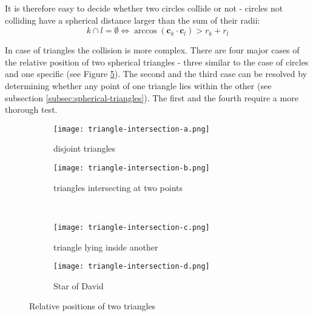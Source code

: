 It is therefore easy to decide whether two circles collide or not - circles not colliding have a spherical distance larger than the sum of their radii:
$$k \cap l = \emptyset \Longleftrightarrow \arccos(\mathbf{c}_k\cdot\mathbf{c}_l)>r_k+r_l$$

In case of triangles the collision is more complex. There are four major cases of the relative position of two spherical triangles - three  similar to the case of circles and one specific (see Figure \ref{fig:triangle-collisions}). The second and the third case can be resolved by determining whether any point of one triangle lies within the other (see subsection \ref{subsec:spherical-triangles}). The first and the fourth require a more thorough test.

\begin{figure}[ht]
\centering
\begin{subfigure}{7cm}
\texttt{[image: triangle-intersection-a.png]}
\caption{disjoint triangles}
\label{fig:disjoint-triangles}
\end{subfigure}
\hspace*{1cm}
\begin{subfigure}{7cm}
\texttt{[image: triangle-intersection-b.png]}
\caption{triangles intersecting at two points}
\label{fig:triangles-intersecting-at-two-points}
\end{subfigure}\\
\begin{subfigure}{7cm}
\texttt{[image: triangle-intersection-c.png]}
\caption{triangle lying inside another}
\label{fig:triangle-lying-inside-another}
\end{subfigure}
\hspace*{1cm}
\begin{subfigure}{7cm}
\texttt{[image: triangle-intersection-d.png]}
\caption{Star of David}
\label{fig:star-of-david}
\end{subfigure}
\caption{Relative positions of two triangles}
\label{fig:triangle-collisions}
\end{figure}

